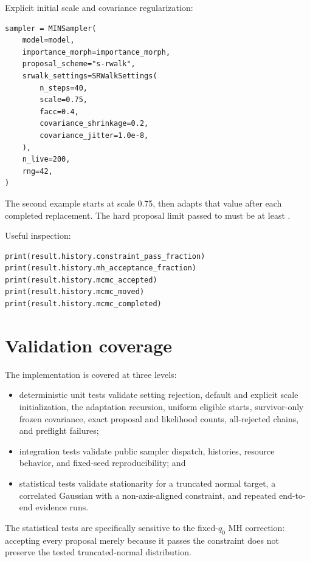 \documentclass[11pt,a4paper]{article}
\newcommand{\code}[1]{\texttt{\detokenize{#1}}}
\begin{document}
Explicit initial scale and covariance regularization:

\begin{lstlisting}
sampler = MINSampler(
    model=model,
    importance_morph=importance_morph,
    proposal_scheme="s-rwalk",
    srwalk_settings=SRWalkSettings(
        n_steps=40,
        scale=0.75,
        facc=0.4,
        covariance_shrinkage=0.2,
        covariance_jitter=1.0e-8,
    ),
    n_live=200,
    rng=42,
)
\end{lstlisting}

The second example starts at scale 0.75, then adapts that value after each
completed replacement.  The hard proposal limit passed to
\code{MINSampler.run()} must be at least \code{n_steps}.

Useful inspection:

\begin{lstlisting}
print(result.history.constraint_pass_fraction)
print(result.history.mh_acceptance_fraction)
print(result.history.mcmc_accepted)
print(result.history.mcmc_moved)
print(result.history.mcmc_completed)
\end{lstlisting}

\section{Validation coverage}

The implementation is covered at three levels:

\begin{itemize}
  \item deterministic unit tests validate setting rejection, default and
        explicit scale initialization, the adaptation recursion, uniform
        eligible starts, survivor-only frozen covariance, exact proposal and
        likelihood counts, all-rejected chains, and preflight failures;
  \item integration tests validate public sampler dispatch, histories,
        resource behavior, and fixed-seed reproducibility; and
  \item statistical tests validate stationarity for a truncated normal target,
        a correlated Gaussian with a non-axis-aligned constraint, and repeated
        end-to-end evidence runs.
\end{itemize}

The statistical tests are specifically sensitive to the fixed-\(q_0\) MH
correction: accepting every proposal merely because it passes the constraint
does not preserve the tested truncated-normal distribution.
\end{document}
